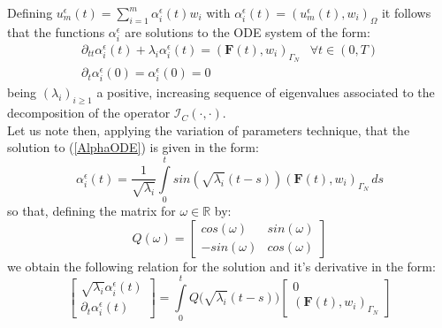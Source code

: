 \begin{enumerate}
    Defining $u^{\epsilon}_m(t) = \sum_{i=1}^m \alpha_i^{\epsilon}(t) w_i$ with $\alpha_i^{\epsilon} (t) = (u^{\epsilon}_m(t),w_i)_{\Omega}$ it follows that the functions $\alpha_i^{\epsilon}$ are solutions to the ODE system of the form:
    \begin{equation}
        \label{AlphaODE}
        \begin{array}{cc}
            \partial_{tt} \alpha_i^{\epsilon}(t) + \lambda_i \alpha_i^{\epsilon}(t) = (\mathbf{F}(t),w_i)_{\Gamma_N}& \forall t \in (0,T) \\
            \partial_t \alpha_i^{\epsilon}(0) = \alpha_i^{\epsilon}(0) = 0 & 
        \end{array}
    \end{equation}
    being $(\lambda_i)_{i \geq 1}$ a positive, increasing sequence of eigenvalues associated to the decomposition of the operator $\mathcal{I}_C(\cdot, \cdot)$.\\
    Let us note then, applying the variation of parameters technique, that the solution to (\ref{AlphaODE}) is given in the form:
    \begin{equation}
        \label{AlphaODEsol}
        \alpha_i^{\epsilon} (t) = \frac{1}{\sqrt{\lambda_i}} \int\limits_0^t sin(\sqrt{\lambda_i} (t-s)) (\mathbf{F}(t),w_i)_{\Gamma_N} \, ds
    \end{equation}
    so that, defining the matrix for $\omega \in \mathbb{R}$ by:
    \begin{equation*}
        Q(\omega) =
        \begin{bmatrix}
        cos(\omega) & sin(\omega) \\
        -sin(\omega) & cos(\omega)
        \end{bmatrix}
    \end{equation*}
    we obtain the following relation for the solution and it's derivative in the form:
    \begin{equation}
        \label{MatrixODEsol}
        \begin{bmatrix}
        \sqrt{\lambda_i} \alpha_i^{\epsilon}(t) \\
        \partial_{t} \alpha_i^{\epsilon}(t) 
        \end{bmatrix}
        = \int \limits_0^t Q\big(\sqrt{\lambda_i}(t-s)\big)
        \begin{bmatrix}
        0 \\
        (\mathbf{F}(t),w_i)_{\Gamma_N}
        \end{bmatrix}
    \end{equation}
    

\end{enumerate}
